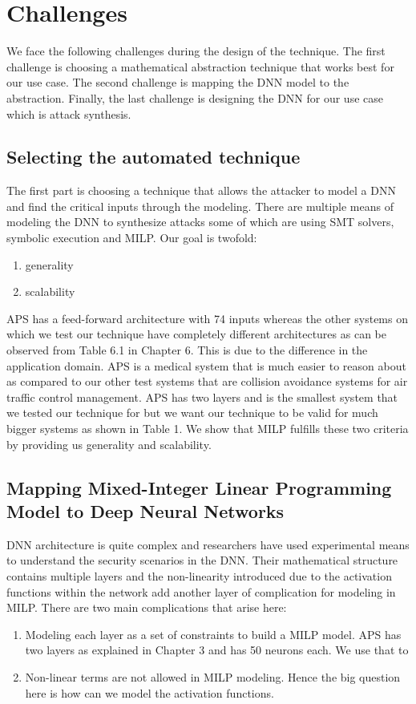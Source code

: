 \chapter{Challenges}
We face  the following challenges during the design of the technique. 
The  first challenge is choosing a mathematical abstraction technique that works best for our use case. 
The second challenge is mapping the \ac{DNN}  model to the abstraction. 
Finally, the last challenge is designing the \ac{DNN}  for our use case which is attack synthesis. 


\section{Selecting  the automated technique}
The first part is choosing a technique that allows the attacker to model a DNN and find the critical inputs through the modeling. 
There are multiple means of modeling the DNN to synthesize attacks some of which are using SMT solvers, symbolic execution and MILP.
Our goal is twofold: 
\begin{enumerate}
	\item generality
	\item scalability
\end{enumerate}

\ac{APS} has a  feed-forward architecture with 74 inputs whereas the other systems on which we test our technique have completely different architectures as can be observed from Table 6.1 in Chapter 6. 
This is due to the difference in the application domain. APS is a medical system that is much easier to reason about as compared to our other test systems that are collision avoidance systems for air traffic control management.
APS has two layers and is the smallest system that we tested our technique for but we want our technique to be valid for much bigger systems as shown in Table 1. 
We show that MILP fulfills these two criteria by providing us generality and scalability. 


\section{ Mapping  Mixed-Integer Linear Programming Model to Deep Neural Networks}

DNN architecture is quite complex and researchers have used experimental means to understand the security scenarios in the DNN. 
Their  mathematical structure contains multiple layers and the non-linearity introduced due to the activation functions within the network add another layer of complication for modeling in \ac{MILP}.
There are two main complications that arise here:
\begin{enumerate}
	\item Modeling each layer as a set of constraints to build a \ac{MILP} model.
	\ac{APS} has two layers as explained in Chapter 3 and has 50 neurons each. 
	We use that to 
	\item Non-linear terms are not allowed in \ac{MILP} modeling. Hence the big question here is how can we model the activation functions. 
\end{enumerate}

